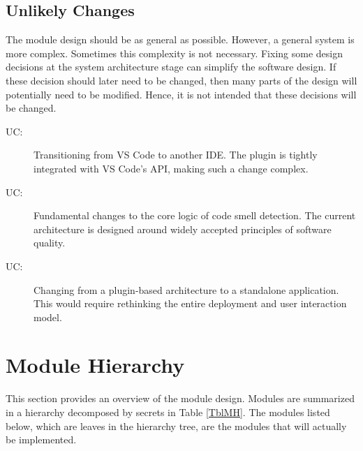 \documentclass[12pt, titlepage]{article}
\newcounter{ucnum}
\newcommand{\uctheucnum}{UC\theucnum}
\begin{document}

\subsection{Unlikely Changes} \label{SecUchange}

The module design should be as general as possible. However, a general system is
more complex. Sometimes this complexity is not necessary. Fixing some design
decisions at the system architecture stage can simplify the software design. If
these decision should later need to be changed, then many parts of the design
will potentially need to be modified. Hence, it is not intended that these
decisions will be changed.

\begin{description}
  \item[ \uctheucnum \label{ucPlatform}:] Transitioning from VS Code to another IDE. The plugin is tightly integrated with VS Code's API, making such a change complex.
  \item[ \uctheucnum \label{ucCoreLogic}:] Fundamental changes to the core logic of code smell detection. The current architecture is designed around widely accepted principles of software quality.
  \item[ \uctheucnum \label{ucPluginType}:] Changing from a plugin-based architecture to a standalone application. This would require rethinking the entire deployment and user interaction model.
\end{description}

\section{Module Hierarchy} \label{SecMH}

This section provides an overview of the module design. Modules are summarized
in a hierarchy decomposed by secrets in Table \ref{TblMH}. The modules listed
below, which are leaves in the hierarchy tree, are the modules that will
actually be implemented.
\end{document}
